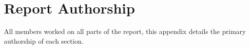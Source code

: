 \chapter{Report Authorship} \label{Chapter:Report Authorship}

\begin{preamble}
	All members worked on all parts of the report, this appendix details the primary authorship of each section.
\end{preamble}

